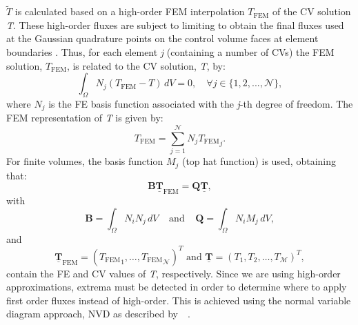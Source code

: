 \documentclass[preprint,authoryear,12pt]{elsarticle}
\begin{document}
$\widetilde{T}$ is calculated based on a high-order FEM interpolation $T_{\text{FEM}}$ of the CV solution {\it T}. These high-order fluxes are subject to limiting to obtain the final fluxes used at the Gaussian quadrature points on the control volume faces at element boundaries \citep{voller_2009,gomes_book_2012}.  Thus, for each element {\it j} (containing a number of CVs) the FEM solution, $T_{\text{FEM}}$, is related to the CV solution, {\it T}, by: 
\begin{equation}
  \int_{\Omega} N_{j} \left({T_{\text{FEM}}} - T\right) \,d V = 0, \quad \forall j\in \{1,2,...,{\mathcal N}\},
\end{equation}
where $N_{j}$ is the FE basis function associated with the {\it j}-th degree of freedom. The FEM representation of {\it T} is given by:
\begin{equation}
  T_{\text{FEM}} = \sum\limits_{j=1}^{\mathcal{N}} N_{j} {T_{\text{FEM}}}_{j}.
\end{equation}
For finite volumes, the basis function $M_{j}$ (top hat function) is used, obtaining that:
\begin{equation}
  \mathbf{B} \underline{\mathbf{T}}_{\text{FEM}} = \mathbf{Q} \underline{\mathbf{T}},
\end{equation} 
with
\begin{displaymath}
  \mathbf{B} = \int_{\Omega} N_{i}N_{j} \,dV \;\;\;\;\text{and}\;\;\;\; \mathbf{Q} = \int_{\Omega} N_{i} M_{j} \,  dV,
\end{displaymath} 
and
\begin{displaymath}
\underline{\mathbf{T}}_{\text{FEM}} = \left({T_{\text{FEM}}}_{1}, \ldots, {T_{\text{FEM}}}_{\mathcal{N}} \right)^{T} \text{ and } \underline{\mathbf{T}} =\left(T_{1}, T_{2}, \ldots, T_\mathcal{M} \right)^{T},
\end{displaymath}
contain the FE and CV values of {\it T}, respectively. Since we are using high-order approximations, extrema must be detected in order to determine where to apply first order fluxes instead of high-order. This is achieved using the normal variable diagram approach, NVD as described by~\citet{darwish_1993}~\citep[see also][]{jasak_1999,darwish_2003}.


\end{document}
